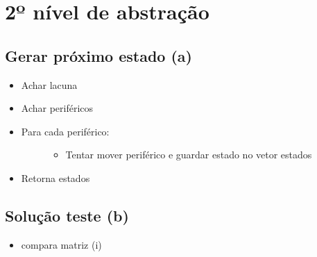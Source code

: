 \documentclass[letterpaper,10pt,openany,oneside,portuges]{sphinxmanual}
\begin{document}
\section{2º nível de abstração}
\label{\detokenize{pseudo:o-nivel-de-abstracao}}

\subsection{Gerar próximo estado (a)}
\label{\detokenize{pseudo:gerar-proximo-estado-a}}\begin{itemize}
\item {} 
Achar lacuna

\item {} 
Achar periféricos

\item {} \begin{description}
\item[{Para cada periférico:}] \leavevmode\begin{itemize}
\item {} 
Tentar mover periférico e guardar estado no vetor estados

\end{itemize}

\end{description}

\item {} 
Retorna estados

\end{itemize}


\subsection{Solução teste (b)}
\label{\detokenize{pseudo:solucao-teste-b}}\begin{itemize}
\item {} 
compara matriz (i)

\end{itemize}

\begin{DUlineblock}{0em}
\item[] 
\item[] 
\end{DUlineblock}
\end{document}
